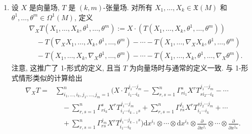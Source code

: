 \begin{description}[font=\normalfont,leftmargin=2em,labelwidth=1.5em]
\begin{enumerate}[label=(\alph*),ref=\alph*,leftmargin=*]
\begin{align*}
  \nabla_X\omega(Y)
  &=X\cdot(\omega(Y))-\omega(\nabla_XY)\\
  &=X\cdot\left(\sum_{i=1}^n\omega_i\,\mathrm{d}x^i(Y)\right)
     -\omega\left(\sum_{i=1}^n\left(X\cdot Y^i+\sum_{j,k=1}^n\Gamma^i_{jk}X^jY^k\right)
         \frac{\partial}{\partial x^i}\right)\\
  &=X\cdot\left(\sum_{i=1}^n\omega_iY^i\right)-\sum_{i=1}^n\omega_i(X\cdot Y^i)
      -\sum_{i,j,k=1}^n\Gamma^i_{jk}X^jY^k\omega_i\\
  &=\sum_{i=1}^n(X\cdot\omega_i)Y^i-\sum_{i=1}^n\left(\sum_{j,k=1}^n\Gamma^k_{ji}X^j\omega_k\right)Y^i\\
  &=\left(\sum_{i=1}^n\left(X\cdot\omega_i-\sum_{j,k=1}^n\Gamma^k_{ji}X^j\omega_k\right)\mathrm{d}x^i\right)(Y).
\end{align*}
\item 设 $X$ 是向量场, $T$ 是 $(k,m)$-张量场. 对所有 $X_1,\ldots,X_k\in\mathfrak X(M)$ 和 $\theta^1,\ldots,\theta^m\in\Omega^1(M)$, 定义
\begin{align*}
  &\nabla_XT(X_1,\ldots,X_k,\theta^1,\ldots,\theta^m)
    :=X\cdot(T(X_1,\ldots,X_k,\theta^1,\ldots,\theta^m))\\
  &\quad-T(\nabla_XX_1,\ldots,X_k,\theta^1,\ldots,\theta^m)
      -\cdots-T(X_1,\ldots,\nabla_XX_k,\theta^1,\ldots,\theta^m)\\
  &\quad-T(X_1,\ldots,X_k,\nabla_X\theta^1,\ldots,\theta^m)
      -\cdots-T(X_1,\ldots,X_k,\theta^1,\ldots,\nabla_X\theta^m).
\end{align*}
注意, 这推广了 1-形式的定义, 且当 $T$ 为向量场时与通常的定义一致. 与 1-形式情形类似的计算给出
\[
  \begin{aligned}
  \nabla_XT={}&\sum_{i_1,\ldots,i_k,j_1,\ldots,j_m=1}^n
  \Biggl( X\cdot T_{i_1\cdots i_k}^{j_1\cdots j_m}
         -\sum_{r,s=1}^n\Gamma^s_{ri_1}X^rT_{si_2\cdots i_k}^{j_1\cdots j_m}-\cdots\\
  &\quad-\sum_{r,s=1}^n\Gamma^s_{ri_k}X^rT_{i_1\cdots i_{k-1}s}^{j_1\cdots j_m}
        +\sum_{r,s=1}^n\Gamma^{j_1}_{rs}X^rT_{i_1\cdots i_k}^{sj_2\cdots j_m}+\cdots\\
  &\quad+\sum_{r,s=1}^n\Gamma^{j_m}_{rs}X^rT_{i_1\cdots i_k}^{j_1\cdots j_{k-1}s}\Biggr)
    \mathrm{d}x^{i_1}\otimes\cdots\otimes\mathrm{d}x^{i_k}
    \otimes\frac{\partial}{\partial x^{j_1}}\otimes\cdots\otimes\frac{\partial}{\partial x^{j_m}}.
  \end{aligned}
\]
\end{enumerate}
\end{description}
